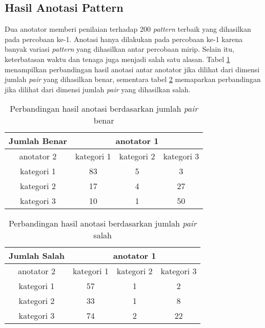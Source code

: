 \subsection{Hasil Anotasi Pattern}
Dua anotator memberi penilaian terhadap 200 \textit{pattern} terbaik yang dihasilkan pada percobaan ke-1. Anotasi hanya dilakukan pada percobaan ke-1 karena banyak variasi \textit{pattern} yang dihasilkan antar percobaan mirip. Selain itu, keterbatasan waktu dan tenaga juga menjadi salah satu alasan. Tabel \ref{table:p-anotasi-benar} menampilkan perbandingan hasil anotasi antar anotator jika dilihat dari dimensi jumlah \textit{pair} yang dihasilkan benar, sementara tabel \ref{table:p-anotasi-salah} memaparkan perbandingan jika dilihat dari dimensi jumlah \textit{pair} yang dihasilkan salah.

\begin{table}
  \centering
  \caption{Perbandingan hasil anotasi berdasarkan jumlah \textit{pair} benar}
  \label{table:p-anotasi-benar}
  \begin{tabular}{|c|c|c|c|}
  \hline
  Jumlah Benar & \multicolumn{3}{c}{ anotator 1 } \\ \hline
  anotator 2 & kategori 1 & kategori 2 & kategori 3 \\ \hline
  kategori 1 & 83 & 5 & 3 \\ \hline
  kategori 2 & 17 & 4 & 27 \\ \hline
  kategori 3 & 10 & 1 & 50 \\ \hline
  \end{tabular} 
\end{table}

\begin{table}
  \centering
  \caption{Perbandingan hasil anotasi berdasarkan jumlah \textit{pair} salah}
  \label{table:p-anotasi-salah}
  \begin{tabular}{|c|c|c|c|}
  \hline
  Jumlah Salah & \multicolumn{3}{c}{ anotator 1 } \\ \hline
  anotator 2 & kategori 1 & kategori 2 & kategori 3 \\ \hline
  kategori 1 & 57 & 1 & 2 \\ \hline
  kategori 2 & 33 & 1 & 8 \\ \hline
  kategori 3 & 74 & 2 & 22 \\ \hline
  \end{tabular} 
\end{table}

